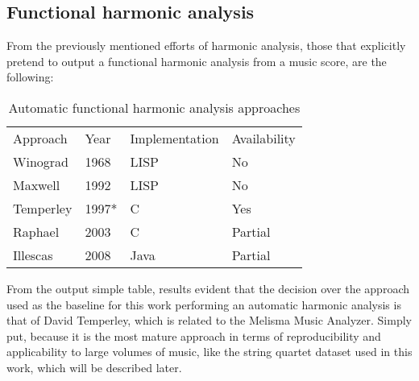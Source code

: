   \subsection{Functional harmonic analysis}
  From the previously mentioned efforts of harmonic analysis, those that explicitly pretend to output a functional harmonic analysis from a music score, are the following:
  \begin{table}[]
    \centering
    \caption{Automatic functional harmonic analysis approaches}
    \label{my-label}
    \begin{tabular}{llll}
      Approach & Year & Implementation & Availability \\
      Winograd & 1968 & LISP & No \\
      Maxwell & 1992 & LISP & No \\
      Temperley & 1997* & C & Yes \\
      Raphael & 2003 & C & Partial \\
      Illescas & 2008 & Java & Partial
    \end{tabular}
  \end{table}
  From the output simple table, results evident that the decision over the approach used as the baseline for this work performing an automatic harmonic analysis is that of David Temperley, which is related to the Melisma Music Analyzer. Simply put, because it is the most mature approach in terms of reproducibility and applicability to large volumes of music, like the string quartet dataset used in this work, which will be described later.

\newpage
